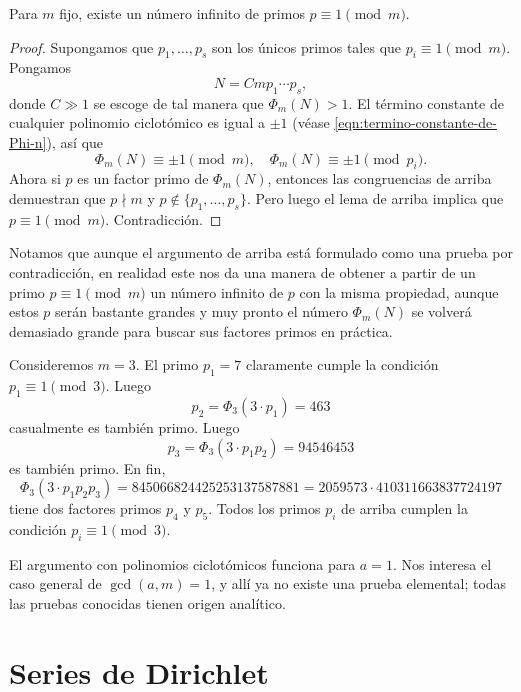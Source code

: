 \begin{teorema}
  Para $m$ fijo, existe un número infinito de primos $p \equiv 1 \pmod{m}$.

  \begin{proof}
    Supongamos que $p_1,\ldots,p_s$ son los únicos primos tales que
    $p_i\equiv 1 \pmod{m}$. Pongamos
    $$N = C m p_1\cdots p_s,$$
    donde $C \gg 1$ se escoge de tal manera que $\Phi_m (N) > 1$.
    El término constante de cualquier polinomio ciclotómico es igual a $\pm 1$
    (véase \eqref{eqn:termino-constante-de-Phi-n}), así que
    $$\Phi_m (N) \equiv \pm 1 \pmod{m}, \quad \Phi_m (N) \equiv \pm 1 \pmod{p_i}.$$
    Ahora si $p$ es un factor primo de $\Phi_m (N)$, entonces las congruencias
    de arriba demuestran que $p \nmid m$ y $p \notin \{ p_1, \ldots, p_s \}$.
    Pero luego el lema de arriba implica que
    $p \equiv 1 \pmod{m}$. Contradicción.
  \end{proof}
\end{teorema}

Notamos que aunque el argumento de arriba está formulado como una prueba por
contradicción, en realidad este nos da una manera de obtener a partir de un
primo $p \equiv 1 \pmod{m}$ un número infinito de $p$ con la misma propiedad,
aunque estos $p$ serán bastante grandes y muy pronto el número $\Phi_m (N)$
se volverá demasiado grande para buscar sus factores primos en práctica.

\begin{ejemplo}
  Consideremos $m = 3$. El primo $p_1 = 7$ claramente cumple la condición
  $p_1 \equiv 1 \pmod{3}$. Luego
  $$p_2 = \Phi_3 (3\cdot p_1) = 463$$
  casualmente es también primo. Luego
  $$p_3 = \Phi_3 (3\cdot p_1 p_2) = 94546453$$
  es también primo. En fin,
  $$\Phi_3 (3\cdot p_1 p_2 p_3) = 845066824425253137587881 = 2059573\cdot 410311663837724197$$
  tiene dos factores primos $p_4$ y $p_5$. Todos los primos $p_i$ de arriba
  cumplen la condición $p_i \equiv 1 \pmod{3}$.
\end{ejemplo}

El argumento con polinomios ciclotómicos funciona para $a = 1$. Nos interesa
el caso general de $\gcd (a,m)=1$, y allí ya no existe una prueba elemental;
todas las pruebas conocidas tienen origen analítico.


\section{Series de Dirichlet}

